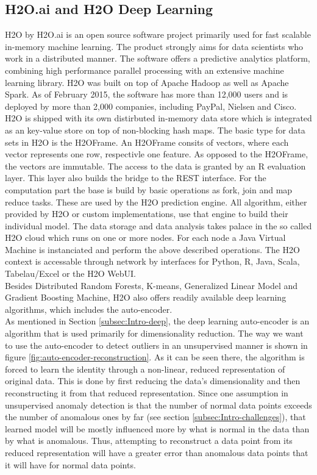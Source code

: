 \documentclass{vldb}
\begin{document}
\subsection{H2O.ai  and H2O Deep Learning}
\label{subsec:Metho-h2o}
H2O by H2O.ai is an open source software project primarily used for fast scalable in-memory machine learning. The product strongly aims for data scientists who work in a distributed manner. The software offers a predictive analytics platform, combining high performance parallel processing with an extensive machine learning library. \cite{website:h2o} H2O was built on top of Apache Hadoop as well as Apache Spark. As of February 2015, the software has more than 12,000 users and is deployed by more than 2,000 companies, including PayPal, Nielsen and Cisco. \cite{booklet:deep-learning}\\

H2O is shipped with its own distirbuted in-memory data store which is integrated as an key-value store on top of non-blocking hash maps. The basic type for data sets in H2O is the H2OFrame. An H2OFrame consits of vectors, where each vector represents one row, respectivle one feature. As opposed to the H2OFrame, the vectors are immutable. The access to the data is granted by an R evaluation layer. This layer also builds the bridge to the REST interface. For the computation part the base is build by basic operations as fork, join and map reduce tasks. These are used by the H2O prediction engine. All algorithm, either provided by H2O or custom implementations, use that engine to build their individual model. The data storage and data analysis takes palace in the so called H2O cloud which runs on one or more nodes. For each node a Java Virtual Machine is instanciated and perform the above described operations. The H2O context is accessable through network by interfaces for Python, R, Java, Scala, Tabelau/Excel or the H2O WebUI. \\

Besides Distributed Random Forests, K-means, Generalized Linear Model and Gradient Boosting Machine, H2O also offers readily available deep learning algorithms, which includes the auto-encoder. \\
As mentioned in Section \ref{subsec:Intro-deep}, the deep learning auto-encoder is an algorithm that is used primarily for dimensionality reduction. The way we want to use the auto-encoder to detect outliers in an unsupervised manner is shown in figure \ref{fig:auto-encoder-reconstruction}. As it can be seen there, the algorithm is forced to learn the identity through a non-linear, reduced representation of original data. This is done by first reducing the data's dimensionality and then reconstructing it from that reduced representation. Since one assumption in unsupervised anomaly detection is that the number of normal data points exceeds the number of anomalous ones by far (see section \ref{subsec:Intro-challenges}), that learned model will be mostly influenced more by what is normal in the data than by what is anomalous. Thus, attempting to reconstruct a data point from its reduced representation will have a greater error than anomalous data points that it will have for normal data points.
\end{document}
